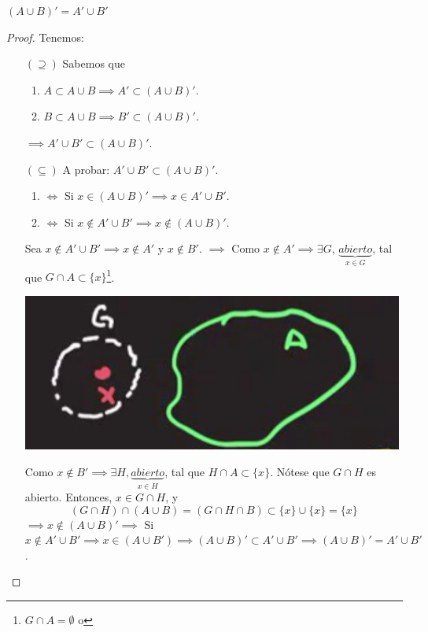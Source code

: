 \begin{prop}
	 $(A\cup B)'=A'\cup B'$
	 \begin{proof}Tenemos:
	 	\begin{enumerate} 
	 	\item[$(\supseteq)$] Sabemos que 
	 	\begin{enumerate}
	 		\item $A\subset A\cup B\implies A'\subset (A\cup B)'$.
	 		\item $B\subset A\cup B\implies B'\subset (A\cup B)'$. 
	 	\end{enumerate}
 	$\implies A'\cup B'\subset (A\cup B)'$. 
	 	\item[$(\subseteq)$] A probar: $A'\cup B'\subset (A\cup B)'$.
	 	\begin{cajita}
	 		\begin{enumerate}
	 			\item $\iff$ Si $x\in(A\cup B)'\implies x\in A'\cup B'$. 
	 			\item $\iff$ Si $x\not\in A'\cup B'\implies x\not\in (A\cup B)'$. 
	 		\end{enumerate}
	 	\end{cajita}
 	Sea $x\not\in A'\cup B' \implies x\not\in A'$ y $x\not\in B'$. $\implies$ Como $x\not \in A'\implies \exists G$, $\underbrace{abierto}_{x\in G}$, tal que $G\cap A\subset \{x\}$\footnote{$G\cap A=\emptyset$ o }.
 	\begin{center}
 		\includegraphics[scale=0.4]{images/2/13}
 	\end{center}
 Como $x\not\in B'\implies \exists H, \underbrace{abierto}_{x\in H}$, tal que $H\cap A\subset \{x\}$. Nótese que $G\cap H$ es abierto. Entonces, $x\in G\cap H$, y 
 $$(G\cap H)\cap (A\cup B)=(G\cap H\cap B)\subset \{x\}\cup \{x\}=\{x\}$$
 $\implies x\not\in (A\cup B)'\implies$ Si $x\not\in A'\cup B'\implies x\in (A\cup B')\implies (A\cup B)'\subset A'\cup B'\implies (A\cup B)'=A'\cup B'$. 
	 	\end{enumerate}
	 \end{proof}
\end{prop}

